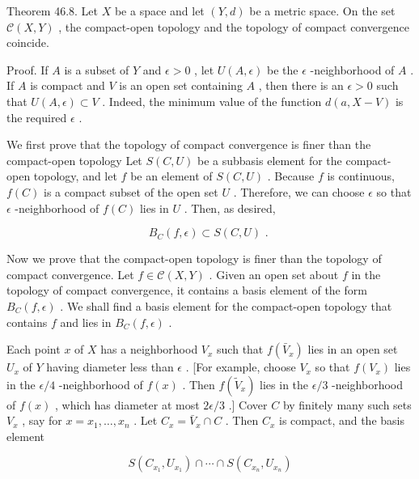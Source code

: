 \documentclass[10pt]{article}
\begin{document}
Theorem 46.8. Let \(X\) be a space and let \(\left( {Y,d}\right)\) be a metric space. On the set \(\mathcal{C}\left( {X,Y}\right)\) , the compact-open topology and the topology of compact convergence coincide.

Proof. If \(A\) is a subset of \(Y\) and \(\epsilon  > 0\) , let \(U\left( {A,\epsilon }\right)\) be the \(\epsilon\) -neighborhood of \(A\) . If \(A\) is compact and \(V\) is an open set containing \(A\) , then there is an \(\epsilon  > 0\) such that \(U\left( {A,\epsilon }\right)  \subset  V\) . Indeed, the minimum value of the function \(d\left( {a,X - V}\right)\) is the required \(\epsilon\) .

We first prove that the topology of compact convergence is finer than the compact-open topology Let \(S\left( {C,U}\right)\) be a subbasis element for the compact-open topology, and let \(f\) be an element of \(S\left( {C,U}\right)\) . Because \(f\) is continuous, \(f\left( C\right)\) is a compact subset of the open set \(U\) . Therefore, we can choose \(\epsilon\) so that \(\epsilon\) -neighborhood of \(f\left( C\right)\) lies in \(U\) . Then, as desired,

\[
{B}_{C}\left( {f,\epsilon }\right)  \subset  S\left( {C,U}\right) \text{ . }
\]

Now we prove that the compact-open topology is finer than the topology of compact convergence. Let \(f \in  \mathcal{C}\left( {X,Y}\right)\) . Given an open set about \(f\) in the topology of compact convergence, it contains a basis element of the form \({B}_{C}\left( {f,\epsilon }\right)\) . We shall find a basis element for the compact-open topology that contains \(f\) and lies in \({B}_{C}\left( {f,\epsilon }\right)\) .

Each point \(x\) of \(X\) has a neighborhood \({V}_{x}\) such that \(f\left( {\bar{V}}_{x}\right)\) lies in an open set \({U}_{x}\) of \(Y\) having diameter less than \(\epsilon\) . [For example, choose \({V}_{x}\) so that \(f\left( {V}_{x}\right)\) lies in the \(\epsilon /4\) -neighborhood of \(f\left( x\right)\) . Then \(f\left( {\widetilde{V}}_{x}\right)\) lies in the \(\epsilon /3\) -neighborhood of \(f\left( x\right)\) , which has diameter at most \({2\epsilon }/3\) .] Cover \(C\) by finitely many such sets \({V}_{x}\) , say for \(x = {x}_{1},\ldots ,{x}_{n}\) . Let \({C}_{x} = {\bar{V}}_{x} \cap  C\) . Then \({C}_{x}\) is compact, and the basis element

\[
S\left( {{C}_{{x}_{1}},{U}_{{x}_{1}}}\right)  \cap  \cdots  \cap  S\left( {{C}_{{x}_{n}},{U}_{{x}_{n}}}\right)
\]
\end{document}
